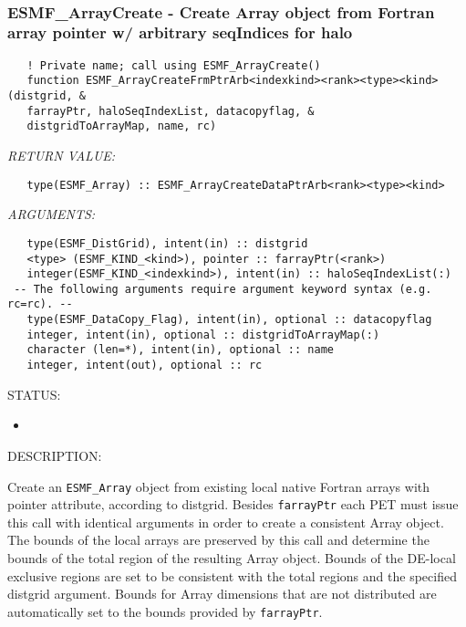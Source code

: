  
\mbox{}\hrulefill\ 
 
\subsubsection [ESMF\_ArrayCreate] {ESMF\_ArrayCreate - Create Array object from Fortran array pointer w/ arbitrary seqIndices for halo}


   
\begin{verbatim}   ! Private name; call using ESMF_ArrayCreate() 
   function ESMF_ArrayCreateFrmPtrArb<indexkind><rank><type><kind>(distgrid, & 
   farrayPtr, haloSeqIndexList, datacopyflag, & 
   distgridToArrayMap, name, rc) 
   \end{verbatim}{\em RETURN VALUE:}
\begin{verbatim}   type(ESMF_Array) :: ESMF_ArrayCreateDataPtrArb<rank><type><kind> 
   \end{verbatim}{\em ARGUMENTS:}
\begin{verbatim}   type(ESMF_DistGrid), intent(in) :: distgrid 
   <type> (ESMF_KIND_<kind>), pointer :: farrayPtr(<rank>) 
   integer(ESMF_KIND_<indexkind>), intent(in) :: haloSeqIndexList(:) 
 -- The following arguments require argument keyword syntax (e.g. rc=rc). --
   type(ESMF_DataCopy_Flag), intent(in), optional :: datacopyflag 
   integer, intent(in), optional :: distgridToArrayMap(:) 
   character (len=*), intent(in), optional :: name 
   integer, intent(out), optional :: rc 
   \end{verbatim}
{\sf STATUS:}
   \begin{itemize} 
   \item{} 
   \end{itemize} 
   
{\sf DESCRIPTION:\\ }

 
   Create an {\tt ESMF\_Array} object from existing local native Fortran 
   arrays with pointer attribute, according to distgrid. Besides 
   {\tt farrayPtr} each PET must issue this call with identical arguments in 
   order to create a consistent Array object. The bounds of the local arrays 
   are preserved by this call and determine the bounds of the total region of 
   the resulting Array object. Bounds of the DE-local exclusive regions are 
   set to be consistent with the total regions and the specified distgrid 
   argument. Bounds for Array dimensions that are not distributed are 
   automatically set to the bounds provided by {\tt farrayPtr}. 
   
